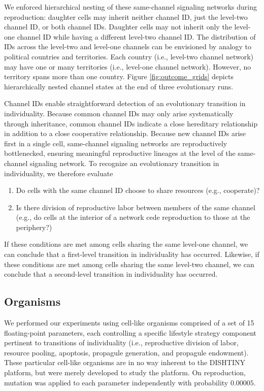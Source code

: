 We enforced hierarchical nesting of these same-channel signaling networks during reproduction:
daughter cells may inherit neither channel ID, just the level-two channel ID, or both channel IDs.
Daughter cells may not inherit only the level-one channel ID while having a different level-two channel ID.
The distribution of IDs across the level-two and level-one channels can be envisioned by analogy to political countries and territories.
Each country (i.e., level-two channel network) may have one or many territories (i.e., level-one channel network).
However, no territory spans more than one country.
Figure \ref{fig:outcome_grids} depicts hierarchically nested channel states at the end of three evolutionary runs.

Channel IDs enable straightforward detection of an evolutionary transition in individuality.
Because common channel IDs may only arise systematically through inheritance, common channel IDs indicate a close hereditary relationship in addition to a close cooperative relationship.
Because new channel IDs arise first in a single cell, same-channel signaling networks are reproductively bottlenecked, ensuring meaningful reproductive lineages at the level of the same-channel signaling network.
To recognize an evolutionary transition in individuality, we therefore evaluate
\begin{enumerate}
\item Do cells with the same channel ID choose to share resources (e.g., cooperate)?
\item Is there division of reproductive labor between members of the same channel (e.g., do cells at the interior of a network cede reproduction to those at the periphery?)
\end{enumerate}
If these conditions are met among cells sharing the same level-one channel, we can conclude that a first-level transition in individuality has occurred.
Likewise, if these conditions are met among cells sharing the same level-two channel, we can conclude that a second-level transition in individuality has occurred.

\subsection{Organisms}

We performed our experiments using cell-like organisms comprised of a set of 15 floating-point parameters, each controlling a specific lifestyle strategy component pertinent to transitions of individuality (i.e., reproductive division of labor, resource pooling, apoptosis, propagule generation, and propagule endowment).
These particular cell-like organisms are in no way inherent to the DISHTINY platform, but were merely developed to study the platform.
On reproduction, mutation was applied to each parameter independently with probability $0.00005$.

